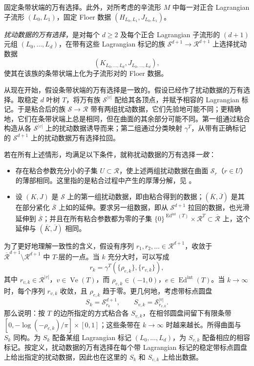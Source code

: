 固定条带状端的万有选择。此外，对所考虑的辛流形 $M$ 中每一对正合 Lagrangian 子流形 $(L_0,L_1)$，固定 Floer 数据 $(H_{L_0,L_1},J_{L_0,L_1})$。
\begin{definition*}
\emph{扰动数据的万有选择}，是对每个 $d\geq2$ 及每个正合 Lagrangian 子流形的 $(d+1)$ 元组 $(L_0,\ldots,L_d)$，在带有这些 Lagrangian 标记的族 $\mathcal S^{d+1}\to\mathcal R^{d+1}$ 上选择扰动数据
\begin{equation}\label{eq:9.20}
(K_{L_0,\ldots,L_d},J_{L_0,\ldots,L_d}),
\end{equation}
使其在该族的条带状端上化为子流形对的 Floer 数据。
\end{definition*}
从现在开始，假设条带状端的万有选择是一致的。假设已经作了扰动数据的万有选择。取稳定 $d$ 叶树 $T$，将万有族 $\mathcal S^{|v|}$ 配给其各顶点，并赋予相容的 Lagrangian 标记。于是粘合后的族 $\mathcal S\to\mathcal R$ 带有两组扰动数据，它们先验地可能不同；更精确地，它们在条带状端上总是相同，但在曲面的其余部分可能不同。第一组通过粘合构造从各 $\mathcal S^{|v|}$ 上的扰动数据诱导而来；第二组通过分类映射 $\gamma^T$，从带有正确标记的 $\mathcal S^{d+1}$ 上的扰动数据万有选择拉回。
\begin{definition*}
若在所有上述情形，均满足以下条件，就称扰动数据的万有选择\emph{一致}：
\begin{itemize}
\item 存在粘合参数充分小的子集 $U\subset\mathcal R$，使上述两组扰动数据在曲面 $\mathcal S_r$（$r\in U$）的薄部相同。这里指的是粘合过程中产生的厚薄分解，见
。
\item 设 $(K,J)$ 是 $\mathcal S$ 上的第一组扰动数据，即由粘合得到的数据；$(\overline K,\overline J)$ 是其在部分紧化 $\overline{\mathcal S}$ 上如的延伸。要求另一组数据，即从 $\mathcal S^{d+1}$ 拉回的数据，也光滑延伸到 $\overline{\mathcal S}$；并且在所有粘合参数都为零的子集 $\{0\}^{\operatorname{Ed}^{\mathrm{int}}(T)}\times\mathcal R^T\subset\overline{\mathcal R}$ 上，这个延伸与 $(\overline K,\overline J)$ 相同。
\end{itemize}

\end{definition*}
为了更好地理解一致性的含义，假设有序列 $r_1,r_2,\ldots\in\mathcal R^{d+1}$，收敛于 $\overline{\mathcal R}^{d+1}\setminus\mathcal R^{d+1}$ 中 $T$-层的一点。当 $k$ 充分大时，可以写成
\begin{equation}\label{eq:9.21}
r_k=\gamma^T(\{\rho_{e,k}\},\{r_{v,k}\}),
\end{equation}
其中 $r_{v,k}\in\mathcal R^{|v|}$，$v\in\operatorname{Ve}(T)$，而 $\rho_{e,k}\in(-1,0)$，$e\in\operatorname{Ed}^{\mathrm{int}}(T)$。当 $k\to\infty$ 时，每个序列 $r_{v,k}$ 收敛，且 $\rho_{e,k}$ 趋于零。更几何地，考虑带标点圆盘
\[
S_k=\mathcal S_{r_k}^{d+1},\qquad S_{v,k}=\mathcal S_{r_{v,k}}^{|v|}.
\]
那么说明：\allowbreak 按 $T$ 的边所指定的方式粘合各 $S_{v,k}$，在相邻圆盘间留下有限条带 $[0,-\log(-\rho_{e,k})/\pi]\times[0,1]$；这些条带在 $k\to\infty$ 时越来越长。所得曲面与 $S_k$ 同构。为 $S_k$ 配备某组 Lagrangian 标记 $(L_0,\ldots,L_d)$，为 $S_{v,k}$ 配备相应的相容标记。按定义，扰动数据的万有选择在每个带 Lagrangian 标记的稳定带标点圆盘上给出指定的扰动数据，因此也在这里的 $S_k$ 和 $S_{v,k}$ 上给出数据。

